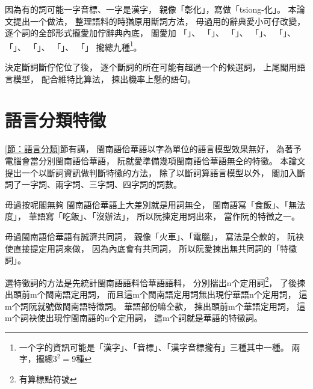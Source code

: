 因為有的詞可能一字音標、一字是漢字，
親像「彰化」，寫做「tsiong-化」。
本論文提出一个做法，
整理語料的時猶原用斷詞方法，
毋過用的辭典愛小可仔改變，
逐个詞的全部形式攏愛加佇辭典內底，
閣愛加
「」、
「」、
「」、
「」、
「」、
「」、
「」、
「」、
「」
攏總九種\footnote{一个字的資訊可能是「漢字」、「音標」、「漢字音標攏有」三種其中一種。
兩字，攏總$3^{2}=9$種}。


決定斷詞斷佇佗位了後，
逐个斷詞的所在可能有超過一个的候選詞，
上尾閣用語言模型，
配合維特比算法，
揀出機率上懸的語句。


\section{語言分類特徵}
\label{節：語言分類特徵}

\ref{節：語言分類}節有講，
閩南語佮華語以字為單位的語言模型效果無好，
為著予電腦會當分別閩南語佮華語，
阮就愛準備幾項閩南語佮華語無仝的特徵。
本論文提出一个以斷詞資訊做判斷特徵的方法，
除了以斷詞算語言模型以外，
閣加入斷詞了一字詞、兩字詞、三字詞、四字詞的詞數。

毋過按呢閣無夠
閩南語佮華語上大差別就是用詞無仝，
閩南語寫「食飯」、「無法度」，
華語寫「吃飯」、「沒辦法」，
所以阮揀定用詞出來，
當作阮的特徵之一。

毋過閩南語佮華語有誠濟共同詞，
親像「火車」、「電腦」，
寫法是仝款的，
阮袂使直接提定用詞來做，
因為內底會有共同詞，
所以阮愛揀出無共同詞的「特徵詞」。

選特徵詞的方法是先統計閩南語語料佮華語語料，
分別揣出n个定用詞\footnote{有算標點符號}，
了後揀出頭前m个閩南語定用詞，
而且這m个閩南語定用詞無出現佇華語n个定用詞，
這m个詞阮就號做閩南語特徵詞。
華語部份嘛仝款，
揀出頭前m个華語定用詞，
這m个詞袂使出現佇閩南語的n个定用詞，
這m个詞就是華語的特徵詞。

